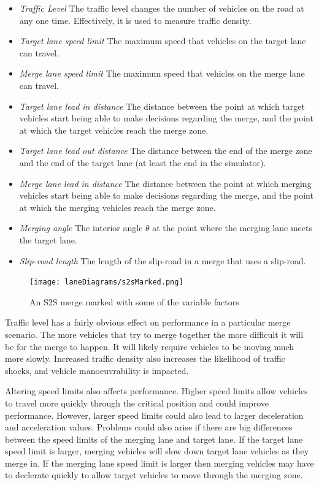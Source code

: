 \begin{itemize}
\item \textit{Traffic Level} 
The traffic level changes the number of vehicles on the road at any one time. Effectively, it is used to measure traffic density.
\item \textit{Target lane speed limit}
The maximum speed that vehicles on the target lane can travel.
\item \textit{Merge lane speed limit}
The maximum speed that vehicles on the merge lane can travel.
\item \textit{Target lane lead in distance}
The distance between the point at which target vehicles start being able to make decisions regarding the merge, and the point at which the target vehicles reach the merge zone.
\item \textit{Target lane lead out distance}
The distance between the end of the merge zone and the end of the target lane (at least the end in the simulator).
\item \textit{Merge lane lead in distance}
The distance between the point at which merging vehicles start being able to make decisions regarding the merge, and the point at which the merging vehicles reach the merge zone.
\item \textit{Merging angle}
The interior angle $\theta$ at the point where the merging lane meets the target lane.
\item \textit{Slip-road length}
The length of the slip-road in a merge that uses a slip-road.
\end{itemize}

\begin{figure}[htb]
\texttt{[image: laneDiagrams/s2sMarked.png]}
\caption{An S2S merge marked with some of the variable factors}
\label{fig:s2sMarked}
\end{figure}

Traffic level has a fairly obvious effect on performance in a particular merge scenario. The more vehicles that try to merge together the more difficult it will be for the merge to happen. It will likely require vehicles to be moving much more slowly. Increased traffic density also increases the likelihood of traffic shocks, and vehicle manoeuvrability is impacted.

Altering speed limits also affects performance. Higher speed limits allow vehicles to travel more quickly through the critical position and could improve performance. However, larger speed limits could also lead to larger deceleration and acceleration values. Problems could also arise if there are big differences between the speed limits of the merging lane and target lane. If the target lane speed limit is larger, merging vehicles will slow down target lane vehicles as they merge in. If the merging lane speed limit is larger then merging vehicles may have to declerate quickly to allow target vehicles to move through the merging zone.

